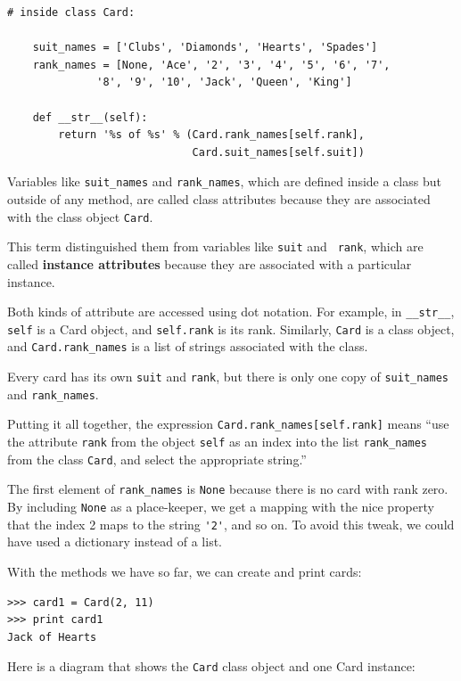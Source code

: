 \documentclass[10pt]{book}
\begin{document}
\beforeverb
\begin{verbatim}
# inside class Card:

    suit_names = ['Clubs', 'Diamonds', 'Hearts', 'Spades']
    rank_names = [None, 'Ace', '2', '3', '4', '5', '6', '7', 
              '8', '9', '10', 'Jack', 'Queen', 'King']

    def __str__(self):
        return '%s of %s' % (Card.rank_names[self.rank],
                             Card.suit_names[self.suit])
\end{verbatim}
\afterverb
%
Variables like \verb"suit_names" and \verb"rank_names", which are
defined inside a class but outside of any method, are called
class attributes because they are associated with the class object 
{\tt Card}.


This term distinguished them from variables like {\tt suit} and {\tt
  rank}, which are called {\bf instance attributes} because they are
associated with a particular instance.


Both kinds of attribute are accessed using dot notation.  For
example, in \verb"__str__", {\tt self} is a Card object,
and {\tt self.rank} is its rank.  Similarly, {\tt Card}
is a class object, and \verb"Card.rank_names" is a
list of strings associated with the class.

Every card has its own {\tt suit} and {\tt rank}, but there
is only one copy of \verb"suit_names" and \verb"rank_names".

Putting it all together, the expression
\verb"Card.rank_names[self.rank]" means ``use the attribute {\tt rank}
from the object {\tt self} as an index into the list \verb"rank_names"
from the class {\tt Card}, and select the appropriate string.''

The first element of \verb"rank_names" is {\tt None} because there
is no card with rank zero.  By including {\tt None} as a place-keeper,
we get a mapping with the nice property that the index 2 maps to the
string \verb"'2'", and so on.  To avoid this tweak, we could have
used a dictionary instead of a list.

With the methods we have so far, we can create and print cards:

\beforeverb
\begin{verbatim}
>>> card1 = Card(2, 11)
>>> print card1
Jack of Hearts
\end{verbatim}
\afterverb
%
Here is a diagram that shows the {\tt Card} class object
and one Card instance:
\end{document}
